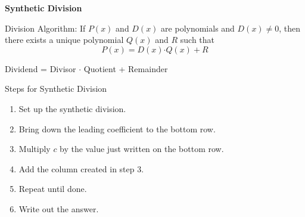 \begin{center}
\textbf{Synthetic Division 
}
\end{center}

\vspce 

Division Algorithm: If $P(x) $ and $D(x) $ are polynomials and $D(x) \neq 0$, then there exists a unique polynomial $Q(x) $ and $R$ such that \[ P(x)  =D(x) \boldsymbol{\cdot} Q(x) +R\]

\begin{center}
Dividend = Divisor $\boldsymbol{\cdot}$ Quotient + Remainder 
\end{center} 

\vspce

Steps for Synthetic Division 
\begin{enumerate}[label = \arabic*. ]
\item \hspce Set up the synthetic division. 
\item \hspce Bring down the leading coefficient to the bottom row. 
\item \hspce Multiply $c$ by the value just written on the bottom row. 
\item \hspce Add the column created in step 3.
\item \hspce Repeat until done. 
\item \hspce Write out the answer. 
\end{enumerate} 

